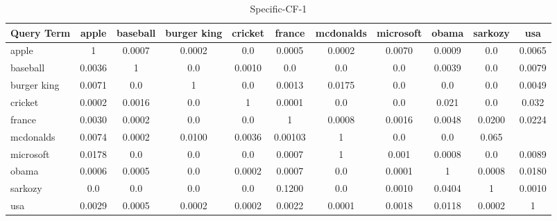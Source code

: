 \documentclass{sig-alternate}
\begin{document}
\begin{table}[!ht]
\centering
\resizebox{14cm}{!} 
{
	\begin{tabular}{|l|c|c|c|c|c|c|c|c|c|c|}
	\hline
	Query Term  & apple & baseball & burger king & cricket & france & mcdonalds & microsoft & obama & sarkozy & usa\\
	\hline
	apple & 1 & 0.0007 & 0.0002 &  0.0 & 0.0005 & 0.0002 & 0.0070 & 0.0009 & 0.0 & 0.0065\\
	\hline
	baseball & 0.0036 & 1 & 0.0 & 0.0010 & 0.0 & 0.0  & 0.0 & 0.0039 & 0.0 & 0.0079\\
	\hline
	burger king & 0.0071 & 0.0 & 1 & 0.0 & 0.0013 & 0.0175 & 0.0 & 0.0 & 0.0 & 0.0049\\
	\hline
	cricket & 0.0002 & 0.0016 & 0.0 & 1 & 0.0001 & 0.0 & 0.0 & 0.021 & 0.0 & 0.032\\
	\hline
	france & 0.0030 & 0.0002 & 0.0 & 0.0 & 1 & 0.0008 & 0.0016 & 0.0048 & 0.0200 & 0.0224\\
	\hline
	mcdonalds & 0.0074 & 0.0002 & 0.0100 & 0.0036 & 0.00103 & 1 & 0.0 & 0.0 & 0.065\\
	\hline
	microsoft & 0.0178 & 0.0 & 0.0 & 0.0 & 0.0007 & 1 & 0.001 & 0.0008 & 0.0 & 0.0089
	\\
	\hline
	obama & 0.0006 & 0.0005 & 0.0 & 0.0002 & 0.0007 & 0.0 & 0.0001 & 1 & 0.0008 & 0.0180
	\\
	\hline
	sarkozy & 0.0 & 0.0 & 0.0 & 0.0 & 0.1200 & 0.0 & 0.0010 & 0.0404 & 1 & 0.0010
	\\
	\hline
	usa & 0.0029 & 0.0005 & 0.0002 & 0.0002 & 0.0022 & 0.0001 & 0.0018 & 0.0118 & 0.0002 & 1\\
	\hline
	\end{tabular}
}
\caption{Specific-CF-1}\label{cf4}
\end{table}
\end{document}
